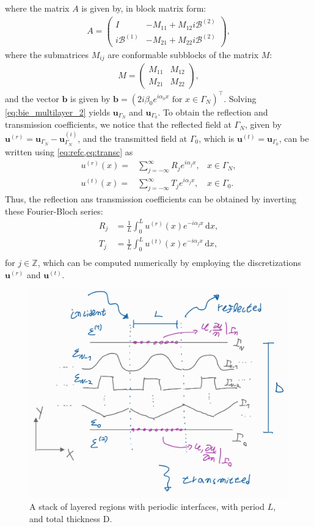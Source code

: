 \documentclass[reprint,amsmath,amssymb,
 aps]{revtex4-2}
\newcommand{\bol}{\boldsymbol}
\newcommand{\de}{\,\mathrm{d}}
\newcommand{\Z}{\mathbb{Z}}
\newcommand{\Bcal}{\mathcal{B}}
\begin{document}
where the matrix $A$ is given by, in block matrix form:
\begin{align}
A = 
\begin{pmatrix}
I & -M_{11}+M_{12}i\Bcal^{(2)}\\
i\Bcal^{(1)} & -M_{21}+M_{22}i\Bcal^{(2)}
\end{pmatrix},
\end{align}
where the submatrices $M_{ij}$ are conformable subblocks of the matrix $M$:
\begin{align}
M = 
\begin{pmatrix}
M_{11} & M_{12}\\
M_{21} & M_{22}
\end{pmatrix},
\end{align}
and the vector $\bol b$ is given by $\bol b = (2i\beta_0 e^{i\alpha_0 x} \text{ for } x \in \Gamma_N)^\top$. Solving \cref{eq:bie_multilayer_2} yields $\bol u_{\Gamma_{N}}$ and $\bol u_{\Gamma_{0}}$. To obtain the reflection and transmission coefficients, we notice that the reflected field at $\Gamma_N$, given by $\bol u^{(r)} = \bol u_{\Gamma_{N}}-\bol u_{\Gamma_{N}}^{(i)}$, and the transmitted field at $\Gamma_0$, which is $\bol u^{(t)} = \bol u_{\Gamma_{0}}$, can be written using \cref{eq:refc,eq:transc} as
\begin{align}
u^{(r)}(x) =& \sum\limits_{j=-\infty}^\infty R_je^{i\alpha_jx }, &x \in \Gamma_N,\\
u^{(t)}(x) =& \sum\limits_{j=-\infty}^\infty T_je^{i\alpha_jx}, &x \in \Gamma_0.
\end{align}
Thus, the reflection ans transmission coefficients can be obtained by inverting these Fourier-Bloch series:
\begin{align}
    R_j &= \frac{1}{L}\int_0^L u^{(r)}(x)e^{-i\alpha_jx}\de x,\\
    T_j &= \frac{1}{L}\int_0^L u^{(t)}(x)e^{-i\alpha_jx}\de x,\\
\end{align}
for $j \in \Z$, which can be computed numerically by employing the discretizations $\bol u^{(r)}$ and $\bol u^{(t)}$.

\begin{figure}[h!]
\includegraphics[width=0.6\columnwidth]{figures/bie_multilayer.jpg}
\caption{A stack of layered regions with periodic interfaces, with period $L$,
and total thickness D.}
\label{fig:bie_multilayer}
\end{figure}
\end{document}
